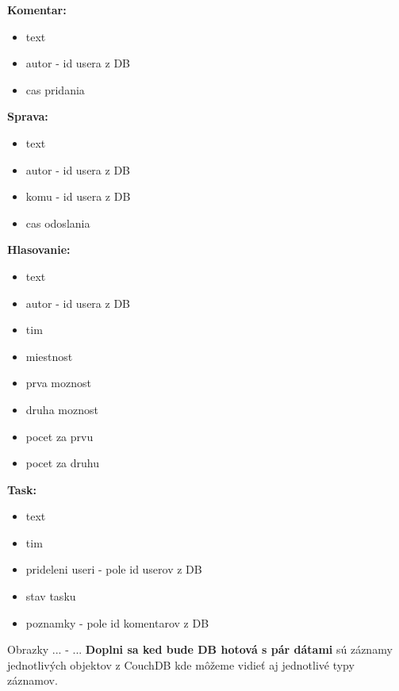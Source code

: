 \textbf{Komentar:}
\indent\begin{itemize}
    \item text
    \item autor - id usera z DB
    \item cas pridania
\end{itemize}

\textbf{Sprava:}
\indent\begin{itemize}
    \item text
    \item autor - id usera z DB
    \item komu - id usera z DB
    \item cas odoslania
\end{itemize}

\textbf{Hlasovanie:}
\indent\begin{itemize}
    \item text
    \item autor - id usera z DB
    \item tim
    \item miestnost
    \item prva moznost
    \item druha moznost
    \item pocet za prvu
    \item pocet za druhu
\end{itemize}

\textbf{Task:}
\indent\begin{itemize}
    \item text
    \item tim
    \item prideleni useri - pole id userov z DB
    \item stav tasku
    \item poznamky - pole id komentarov z DB
\end{itemize}

\indent Obrazky ... - ... \textbf{Doplni sa ked bude DB hotová s pár dátami} sú záznamy jednotlivých objektov z CouchDB kde môžeme vidieť aj jednotlivé typy záznamov. 
